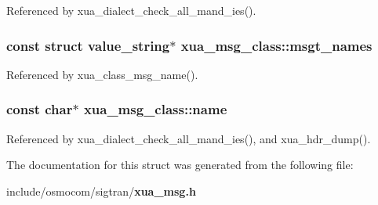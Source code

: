 Referenced by xua\+\_\+dialect\+\_\+check\+\_\+all\+\_\+mand\+\_\+ies().

\subsubsection[{msgt\+\_\+names}]{\setlength{\rightskip}{0pt plus 5cm}const struct value\+\_\+string$\ast$ xua\+\_\+msg\+\_\+class\+::msgt\+\_\+names}\label{structxua__msg__class_ae8f0cdfd8cc0000034b11dbc20d2a52a}


Referenced by xua\+\_\+class\+\_\+msg\+\_\+name().

\subsubsection[{name}]{\setlength{\rightskip}{0pt plus 5cm}const char$\ast$ xua\+\_\+msg\+\_\+class\+::name}\label{structxua__msg__class_a33496fe5df5775d4680feab7403ba93a}


Referenced by xua\+\_\+dialect\+\_\+check\+\_\+all\+\_\+mand\+\_\+ies(), and xua\+\_\+hdr\+\_\+dump().



The documentation for this struct was generated from the following file\+:\begin{DoxyCompactItemize}
\item 
include/osmocom/sigtran/{\bf xua\+\_\+msg.\+h}\end{DoxyCompactItemize}
